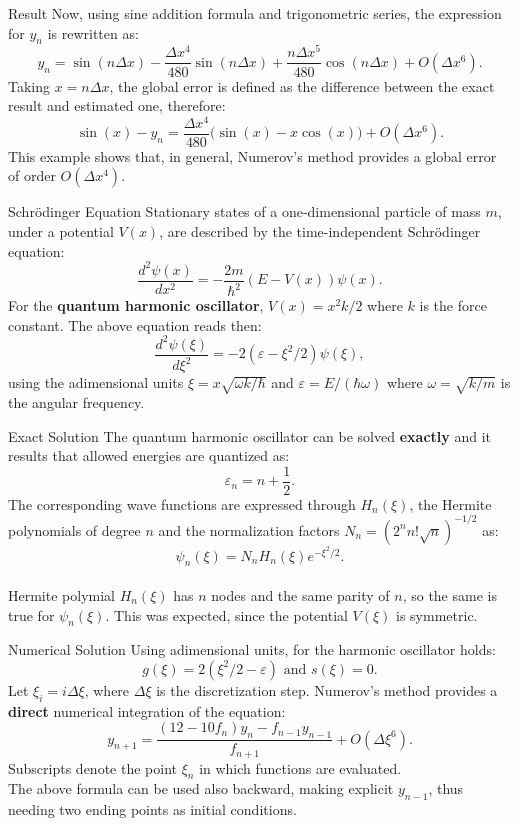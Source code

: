 \documentclass{beamer}
\begin{document}
\begin{frame}{Result}
Now, using sine addition formula and trigonometric series, the expression for $y_n$ is rewritten as:
$$y_n=\sin(n\Delta x)-\frac{\Delta x^4}{480}\sin(n\Delta x)+\frac{n\Delta x^5}{480}\cos(n\Delta x)+O(\Delta x^6).$$
Taking $x=n\Delta x$, the global error is defined as the difference between the exact result and estimated one, therefore:
$$\sin(x)-y_n=\frac{\Delta x^4}{480}\big(\sin(x)-x\cos(x)\big)+O(\Delta x^6).$$
This example shows that, in general, Numerov's method provides a global error of order $O(\Delta x^4)$.
\end{frame}

\begin{frame}{Schr\"{o}dinger Equation}
Stationary states of a one-dimensional particle of mass $m$, under a potential $V(x)$, are described by the time-independent Schr\"{o}dinger equation:
$$\frac{d^2\psi(x)}{dx^2}=-\frac{2m}{\hbar^2}(E-V(x))\psi(x).$$
For the \textbf{quantum harmonic oscillator}, $V(x)=x^2k/2$ where $k$ is the force constant. The above equation reads then:
$$\frac{d^2\psi(\xi)}{d\xi^2}=-2(\varepsilon-\xi^2/2)\psi(\xi),$$
using the adimensional units $\xi=x\sqrt{\omega k/\hbar}$ and $\varepsilon=E/(\hbar\omega)$ where $\omega=\sqrt{k/m}$ is the angular frequency.
\end{frame}

\begin{frame}{Exact Solution}
The quantum harmonic oscillator can be solved \textbf{exactly} and it results that allowed energies are quantized as:
$$\varepsilon_n=n+\frac{1}{2}.$$  
The corresponding wave functions are expressed through $H_n(\xi)$, the Hermite polynomials of degree $n$ and the normalization factors $N_n=(2^nn!\sqrt{n})^{-1/2}$ as:
$$\psi_n(\xi)=N_nH_n(\xi)e^{-\xi^2/2}.$$\\
Hermite polymial $H_n(\xi)$ has $n$ nodes and the same parity of $n$, so the same is true for $\psi_n(\xi)$. This was expected, since the potential $V(\xi)$ is symmetric.
\end{frame}

\begin{frame}{Numerical Solution}
Using adimensional units, for the harmonic oscillator holds:
$$g(\xi)=2(\xi^2/2-\varepsilon)\text{ and }s(\xi)=0.$$
Let $\xi_i=i\Delta \xi$, where $\Delta \xi$ is the discretization step. Numerov's method provides a \textbf{direct} numerical integration of the equation:
$$y_{n+1}=\frac{(12-10f_n)y_n-f_{n-1}y_{n-1}}{f_{n+1}}+O(\Delta \xi^6).$$
Subscripts denote the point $\xi_n$ in which functions are evaluated.\\
\vspace{\baselineskip}
The above formula can be used also backward, making explicit $y_{n-1}$, thus needing two ending points as initial conditions.
\end{frame}
\end{document}
